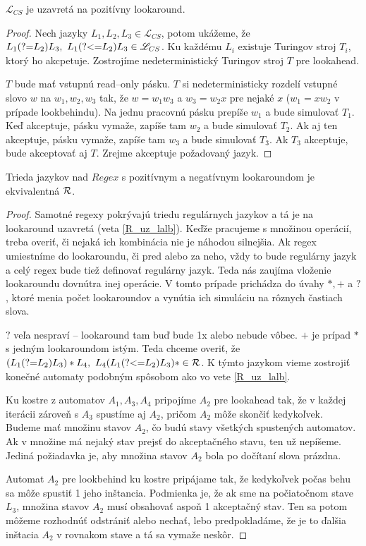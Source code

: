 \documentclass{svk_long_sk}
\def\R{{\cal R}} %
\def\L{\mathscr{L}} %
\def\re{Regex}
\def\lookahead{\text{(?=}}
\def\lookbehind{\text{(?\textless =}}
\begin{document}
\begin{theorem}
$\L_{CS}$ je uzavretá na pozitívny lookaround.
\end{theorem}
\begin{proof}
Nech jazyky $L_1,L_2,L_3\in\L_{CS}$, potom ukážeme, že $L_1\lookahead L_2)L_3, ~L_1\lookbehind L_2) L_3 \in\L_{CS}$. Ku každému $L_i$ existuje Turingov stroj $T_i$, ktorý ho akcpetuje. Zostrojíme nedeterministický Turingov stroj $T$ pre lookahead.

$T$ bude mať vstupnú read--only pásku. $T$ si nedeterministicky rozdelí vstupné slovo $w$ na $w_1,w_2, w_3$ tak, že $w = w_1w_3$ a $w_3=w_2x$ pre nejaké $x$ ($w_1=xw_2$ v prípade lookbehindu). Na jednu pracovnú pásku prepíše $w_1$ a bude simulovať $T_1$. Keď akceptuje, pásku vymaže, zapíše tam $w_2$ a bude simulovať $T_2$. Ak aj ten akceptuje, pásku vymaže, zapíše tam $w_3$ a bude simulovať $T_3$. Ak $T_3$ akceptuje, bude akceptovať aj $T$. Zrejme akceptuje požadovaný jazyk.
\end{proof}

\begin{theorem}\label{re_lalb_in_R}
Trieda jazykov nad $\re$ s pozitívnym a negatívnym lookaroundom je ekvivalentná $\R$.
\end{theorem}
\begin{proof}
Samotné regexy pokrývajú triedu regulárnych jazykov a tá je na lookaround uzavretá (veta \ref{R_uz_lalb}). Keďže pracujeme s množinou operácií, treba overiť, či nejaká ich kombinácia nie je náhodou silnejšia. Ak regex umiestníme do lookaroundu, či pred alebo za neho, vždy to bude regulárny jazyk a celý regex bude tiež definovať regulárny jazyk. Teda nás zaujíma vloženie lookaroundu dovnútra inej operácie. V tomto prípade prichádza do úvahy $*,+$ a $?$, ktoré menia počet lookaroundov a vynútia ich simuláciu na rôznych častiach slova.

$?$ veľa nespraví -- lookaround tam buď bude 1x alebo nebude vôbec. $+$ je prípad $*$ s jedným lookaroundom istým. Teda chceme overiť, že $(L_1 \lookahead L_2) L_3)*L_4,~L_4(L_1 \lookbehind L_2) L_3)* \in \R$. K týmto jazykom vieme zostrojiť konečné automaty podobným spôsobom ako vo vete \ref{R_uz_lalb}. 

Ku kostre z automatov $A_1,A_3,A_4$ pripojíme $A_2$ pre lookahead tak, že v každej iterácii zároveň s $A_3$ spustíme aj $A_2$, pričom $A_2$ môže skončiť kedykoľvek. Budeme mať množinu stavov $A_2$, čo budú stavy všetkých spustených automatov. Ak v množine má nejaký stav prejsť do akceptačného stavu, ten už nepíšeme. Jediná požiadavka je, aby množina stavov $A_2$ bola po dočítaní slova prázdna.

Automat $A_2$ pre lookbehind ku kostre pripájame tak, že kedykoľvek počas behu sa môže spustiť 1 jeho inštancia. Podmienka je, že ak sme na počiatočnom stave $L_3$, množina stavov $A_2$ musí obsahovať aspoň 1 akceptačný stav. Ten sa potom môžeme rozhodnúť odstrániť alebo nechať, lebo predpokladáme, že je to ďalšia inštacia $A_2$ v rovnakom stave a tá sa vymaže neskôr.
\end{proof}
\end{document}
